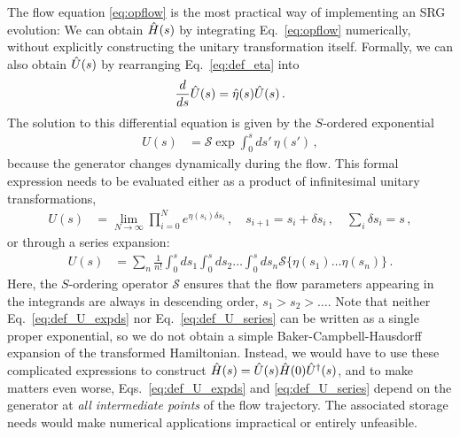 The flow equation \eqref{eq:opflow} is the most practical way of implementing
an SRG evolution: We can obtain $\hat{H}(s)$ by integrating Eq.~\eqref{eq:opflow} 
numerically, without explicitly constructing the unitary transformation itself. 
Formally, we can also obtain $\hat{U}(s)$ by rearranging Eq.~\eqref{eq:def_eta} into
\begin{equation}\label{eq:Uflow}
  \totd{}{s}\UO(s) = \etaO(s)\UO(s)\,.
\end{equation}
The solution to this differential equation is given by the $S$-ordered 
exponential
\begin{align}
  U(s) &= \mathcal{S}\exp \int^s_0 ds'\,\eta(s') \label{eq:def_U_pathexp}\,,
\end{align}
because the generator changes dynamically during the flow. This formal expression 
needs to be evaluated either as a product of infinitesimal unitary transformations,
\begin{align}       \label{eq:def_U_expds}
   U(s) &= \lim_{N\to\infty}\prod^{N}_{i=0} e^{\eta(s_i)\delta s_i}\,,\quad s_{i+1}=s_i+\delta s_i\,,\quad \sum_{i}\delta s_i=s\,,
\end{align}
or through a series expansion:
\begin{align}     \label{eq:def_U_series}
   U(s) &= \sum_n \frac{1}{n!}\int^s_0 ds_1 \int^s_0 ds_2 \ldots 
          \int^s_0 ds_n \mathcal{S}\{\eta(s_1)\ldots\eta(s_n)\}\,.
\end{align}
Here, the $S$-ordering operator $\mathcal{S}$ ensures that the flow parameters 
appearing in the integrands are always in descending order,
$s_1 > s_2 > \ldots$. Note that neither Eq.~\eqref{eq:def_U_expds} nor Eq.~\eqref{eq:def_U_series} 
can be written as a single proper exponential, so we do not obtain
a simple Baker-Campbell-Hausdorff expansion of the transformed
Hamiltonian. Instead, we would have to use these complicated expressions 
to construct $\hat{H}(s)=\hat{U}(s)\hat{H}(0)\hat{U}^\dag(s)$, and to make matters even worse, Eqs.~\eqref{eq:def_U_expds}
and \eqref{eq:def_U_series} depend on the generator at \emph{all intermediate points} 
of the flow trajectory. The associated storage needs would make numerical applications
impractical or entirely unfeasible.

